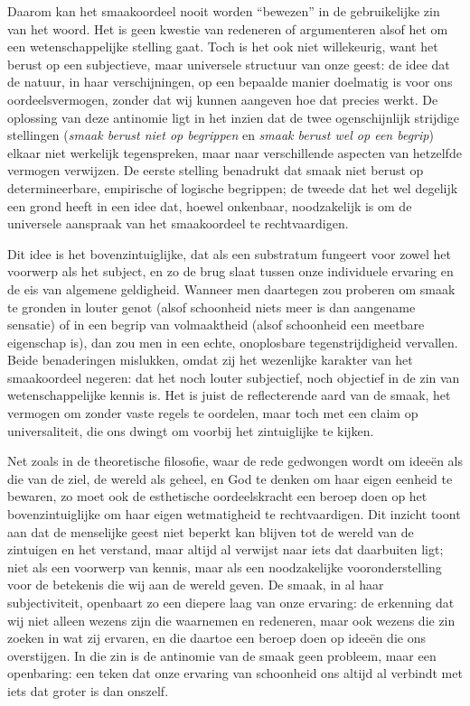 \begin{mdframed}[leftmargin=0pt,rightmargin=0pt,backgroundcolor=blue!6,linecolor=white,innertopmargin=6pt,innerbottommargin=6pt]
Daarom kan het smaakoordeel nooit worden ``bewezen'' in de gebruikelijke zin van het woord. Het is geen kwestie van redeneren of argumenteren alsof het om een wetenschappelijke stelling gaat. Toch is het ook niet willekeurig, want het berust op een subjectieve, maar universele structuur van onze geest: de idee dat de natuur, in haar verschijningen, op een bepaalde manier doelmatig is voor ons oordeelsvermogen, zonder dat wij kunnen aangeven hoe dat precies werkt. De oplossing van deze antinomie ligt in het inzien dat de twee ogenschijnlijk strijdige stellingen (\textit{smaak berust niet op begrippen} en \textit{smaak berust wel op een begrip}) elkaar niet werkelijk tegenspreken, maar naar verschillende aspecten van hetzelfde vermogen verwijzen. De eerste stelling benadrukt dat smaak niet berust op determineerbare, empirische of logische begrippen; de tweede dat het wel degelijk een grond heeft in een idee dat, hoewel onkenbaar, noodzakelijk is om de universele aanspraak van het smaakoordeel te rechtvaardigen.

Dit idee is het bovenzintuiglijke, dat als een substratum fungeert voor zowel het voorwerp als het subject, en zo de brug slaat tussen onze individuele ervaring en de eis van algemene geldigheid. Wanneer men daartegen zou proberen om smaak te gronden in louter genot (alsof schoonheid niets meer is dan aangename sensatie) of in een begrip van volmaaktheid (alsof schoonheid een meetbare eigenschap is), dan zou men in een echte, onoplosbare tegenstrijdigheid vervallen. Beide benaderingen mislukken, omdat zij het wezenlijke karakter van het smaakoordeel negeren: dat het noch louter subjectief, noch objectief in de zin van wetenschappelijke kennis is. Het is juist de reflecterende aard van de smaak, het vermogen om zonder vaste regels te oordelen, maar toch met een claim op universaliteit, die ons dwingt om voorbij het zintuiglijke te kijken.

Net zoals in de theoretische filosofie, waar de rede gedwongen wordt om ideeën als die van de ziel, de wereld als geheel, en God te denken om haar eigen eenheid te bewaren, zo moet ook de esthetische oordeelskracht een beroep doen op het bovenzintuiglijke om haar eigen wetmatigheid te rechtvaardigen. Dit inzicht toont aan dat de menselijke geest niet beperkt kan blijven tot de wereld van de zintuigen en het verstand, maar altijd al verwijst naar iets dat daarbuiten ligt; niet als een voorwerp van kennis, maar als een noodzakelijke vooronderstelling voor de betekenis die wij aan de wereld geven. De smaak, in al haar subjectiviteit, openbaart zo een diepere laag van onze ervaring: de erkenning dat wij niet alleen wezens zijn die waarnemen en redeneren, maar ook wezens die zin zoeken in wat zij ervaren, en die daartoe een beroep doen op ideeën die ons overstijgen. In die zin is de antinomie van de smaak geen probleem, maar een openbaring: een teken dat onze ervaring van schoonheid ons altijd al verbindt met iets dat groter is dan onszelf.


\end{mdframed}
